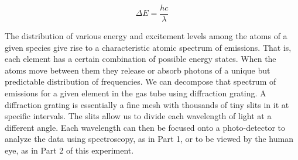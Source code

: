 \documentclass{article}
\begin{document}
$$
    \Delta E = \frac{hc}{\lambda}
$$

The distribution of various energy and excitement levels among the atoms of a given species give rise to a characteristic atomic spectrum of emissions. That is, each element has a certain combination of possible energy states. When the atoms move between them they release or absorb photons of a unique but predictable distribution of frequencies. We can decompose that spectrum of emissions for a given element in the gas tube using diffraction grating. A diffraction grating is essentially a fine mesh with thousands of tiny slits in it at specific intervals. The slits allow us to divide each wavelength of light at a different angle. Each wavelength can then be focused onto a photo-detector to analyze the data using spectroscopy, as in Part 1, or to be viewed by the human eye, as in Part 2 of this experiment.
\end{document}
